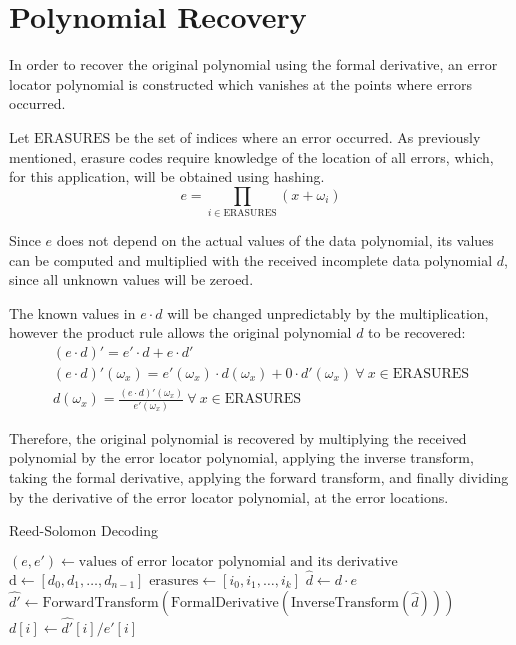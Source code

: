 \section{Polynomial Recovery}

In order to recover the original polynomial using the formal derivative, an error locator polynomial is constructed which vanishes at the points where errors occurred.

Let $\text{ERASURES}$ be the set of indices where an error occurred. As previously mentioned, erasure codes require knowledge of the location of all errors, which, for this application, will be obtained using hashing.
\[e = \prod_{i \in \text{ERASURES}} (x + \omega_i)\]

Since $e$ does not depend on the actual values of the data polynomial, its values can be computed and multiplied with the received incomplete data polynomial $d$, since all unknown values will be zeroed.

The known values in $e \cdot d$ will be changed unpredictably by the multiplication, however the product rule allows the original polynomial $d$ to be recovered:
\begin{gather*}
(e \cdot d)' = e' \cdot d + e \cdot d'\\
(e \cdot d)'(\omega_x) = e'(\omega_x) \cdot d(\omega_x) + 0 \cdot d'(\omega_x)\ \forall\ x \in \text{ERASURES}\\
d(\omega_x) = \frac{(e \cdot d)'(\omega_x)}{e'(\omega_x)}\ \forall\ x \in \text{ERASURES}
\end{gather*}

Therefore, the original polynomial is recovered by multiplying the received polynomial by the error locator polynomial, applying the inverse transform, taking the formal derivative, applying the forward transform,
and finally dividing by the derivative of the error locator polynomial, at the error locations.

\begin{algorithm}
    \caption{Reed-Solomon Decoding}
    \begin{algorithmic}
        \State $(e, e') \gets \text{values of error locator polynomial and its derivative}$
        \State $\text{d} \gets [d_0, d_1, \ldots, d_{n - 1}]$ 
        \State $\text{erasures} \gets [i_0, i_1, \ldots, i_k]$ 
        \State $\hat{d} \gets d \cdot e$ 
        \State $\hat{d'} \gets \text{ForwardTransform}(\text{FormalDerivative}(\text{InverseTransform}(\hat{d})))$
            \State $d[i] \gets \hat{d'}[i] / e'[i]$
        \EndFor
    \end{algorithmic}
\end{algorithm}

